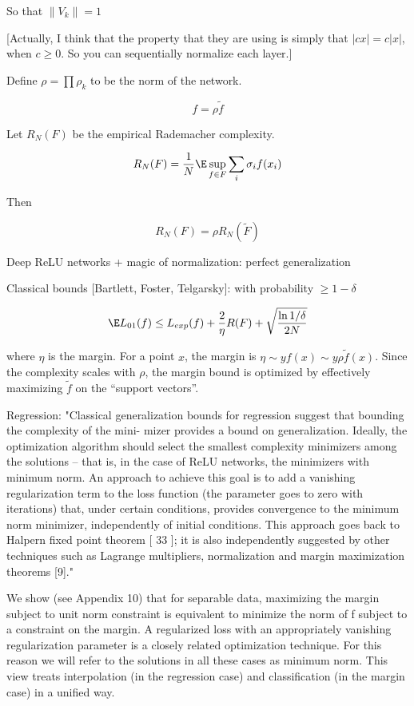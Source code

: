 \documentclass[english]{article}
\begin{document}
So that $\|V_k\|=1$%

[Actually, I think that the property that they are using is simply that $|cx|=c|x|$, when $c\ge 0$. So you can sequentially normalize each layer.]

Define $\rho = \prod \rho_k$ to be the norm of the network.

$$f = \rho \tilde f$$

Let $R_N(F)$ be the empirical Rademacher complexity. 

$$R_N(F) = \frac1N \E \sup_{f\in F} \sum_i \sigma_if(x_i)$$

Then

$$R_N(F) = \rho R_N(\tilde F)$$


\item Deep ReLU networks + magic of normalization: perfect generalization

Classical bounds [Bartlett, Foster, Telgarsky]: with probability $\ge 1-\delta$

$$\E L_{01}(f) \le L_{exp}(f)
+ 
\frac2\eta R(F)
+ 
\sqrt{\frac{\ln 1/\delta}{2N}}
$$

where $\eta$ is the margin. For a point $x$, the margin is $\eta \sim yf(x)  \sim y \rho \tilde f(x)$. Since the complexity scales with $\rho$, the margin bound is optimized by effectively maximizing $\tilde f$
on the “support vectors”.

Regression: 
"Classical generalization bounds for regression suggest that bounding the complexity of the mini-
mizer provides a bound on generalization. Ideally, the optimization algorithm should select the
smallest complexity minimizers among the solutions – that is, in the case of ReLU networks,
the minimizers with minimum norm. An approach to achieve this goal is to add a vanishing
regularization term to the loss function (the parameter goes to zero with iterations) that, under
certain conditions, provides convergence to the minimum norm minimizer, independently of
initial conditions. This approach goes back to Halpern fixed point theorem [ 33 ]; it is also
independently suggested by other techniques such as Lagrange multipliers, normalization and
margin maximization theorems [9]."

We show (see Appendix 10) that for separable data, maximizing the margin subject to unit
norm constraint is equivalent to minimize the norm of f subject to a constraint on the margin.
A regularized loss with an appropriately vanishing regularization parameter is a closely related
optimization technique. For this reason we will refer to the solutions in all these cases as minimum
norm. This view treats interpolation (in the regression case) and classification (in the margin
case) in a unified way.
\end{document}
